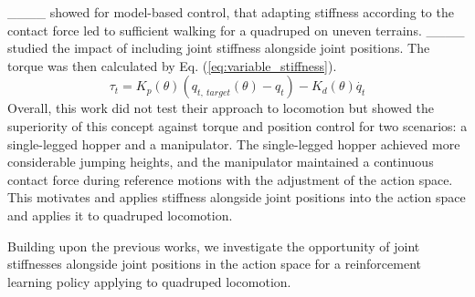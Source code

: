____ showed for model-based control, that adapting stiffness according to the contact force led to sufficient walking for a quadruped on uneven terrains. ____ studied the impact of including joint stiffness alongside joint positions. 
The torque was then calculated by Eq. (\ref{eq:variable_stiffness}).  
\begin{equation}
    \tau_t = K_p(\theta) (q_{t,\ target}(\theta) - q_t) - K_d(\theta) \dot{q_t}  \label{eq:variable_stiffness}
\end{equation}
Overall, this work did not test their approach to locomotion but showed the superiority of this concept against torque and position control for two scenarios: a single-legged hopper and a manipulator. The single-legged hopper achieved more considerable jumping heights, and the manipulator maintained a continuous contact force during reference motions with the adjustment of the action space. 
This motivates and applies stiffness alongside joint positions into the action space and applies it to quadruped locomotion.

Building upon the previous works, we investigate the opportunity of joint stiffnesses alongside joint positions in the action space for a reinforcement learning policy applying to quadruped locomotion.